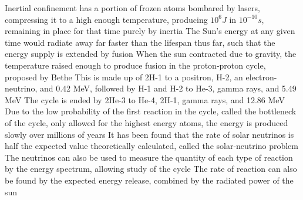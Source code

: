 \documentclass[11 pt, twoside]{article}
\newenvironment{outline*}
{
	\begin{outline}[enumerate]
	}
	{\end{outline}
}
\begin{document}
\begin{outline*}
			\4 Inertial confinement has a portion of frozen atoms bombared by lasers, compressing it to a high enough temperature, producing $10^6 J$ in $10^{-10} s$, remaining in place for that time purely by inertia
	\2 The Sun's energy at any given time would radiate away far faster than the lifespan thus far, such that the energy supply is extended by fusion
		\3 When the sun contracted due to gravity, the temperature raised enough to produce fusion in the proton-proton cycle, proposed by Bethe
			\4 This is made up of 2H-1 to a positron, H-2, an electron-neutrino, and 0.42 MeV, followed by H-1 and H-2 to He-3, gamma rays, and 5.49 MeV
			\4 The cycle is ended by 2He-3 to He-4, 2H-1, gamma rays, and 12.86 MeV
		\3 Due to the low probability of the first reaction in the cycle, called the bottleneck of the cycle, only allowed for the highest energy atoms, the energy is produced slowly over millions of years
		\3 It has been found that the rate of solar neutrinos is half the expected value theoretically calculated, called the solar-neutrino problem
			\4 The neutrinos can also be used to measure the quantity of each type of reaction by the energy spectrum, allowing study of the cycle
		\3 The rate of reaction can also be found by the expected energy release, combined by the radiated power of the sun
\end{outline*}
\end{document}
